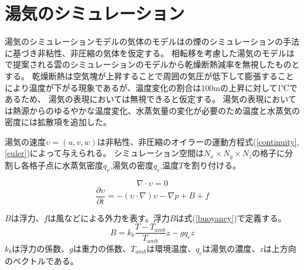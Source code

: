 \section{湯気のシミュレーション}

湯気のシミュレーションモデルの気体のモデルは\cite{Fedkiw2001}の煙のシミュレーションの手法に基づき非粘性、非圧縮の気体を仮定する。
相転移を考慮した湯気のモデルは\cite{Miyazaki2002}\cite{Dobashi2008}で提案される雲のシミュレーションのモデルから乾燥断熱減率を無視したものとする。
乾燥断熱は空気塊が上昇することで周囲の気圧が低下して膨張することにより温度が下がる現象であるが、温度変化の割合は100mの上昇に対して1℃であるため、
湯気の表現においては無視できると仮定する。
湯気の表現においては熱源からのゆるやかな温度変化、水蒸気量の変化が必要のため温度と水蒸気の密度には拡散項を追加した。

湯気の速度$\upsilon=(u,v,w)$は非粘性、非圧縮のオイラーの運動方程式(\ref{continuity},\ref{euler})によって与えられる。
シミュレーション空間は$N_{x} \times N_{y} \times N_{z}$の格子に分割し各格子点に水蒸気密度$q_{v}$,湯気の密度$q_{c}$,温度$T$を割り付ける。

\begin{equation}
\label{continuity}
\nabla \cdot \upsilon = 0
\end{equation}
\begin{equation}
\label{euler}
\frac{\partial \upsilon}{\partial t} = -(\upsilon \cdot \nabla)\upsilon - \nabla p + B + f
\end{equation}

$B$は浮力、$f$は風などによる外力を表す。浮力$B$は式(\ref{buoyancy})で定義する。
\begin{equation}
\label{buoyancy}
B=k_{b}\frac{T-T_{amb}}{T_{amb}}z-gq_{c}z
\end{equation}
$k_{b}$は浮力の係数、$g$は重力の係数、$T_{amb}$は環境温度、$q_{c}$は湯気の濃度、$z$は上方向のベクトルである。

